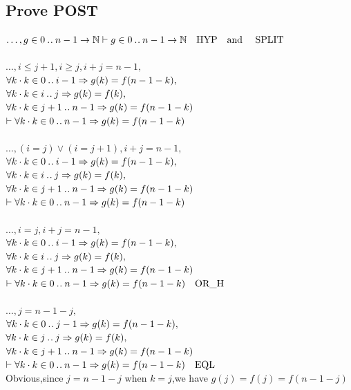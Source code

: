 \documentclass[11pt,a4paper,fleqn]{article}
\begin{document}
\subsection{ Prove POST}
\noindent
$\ldots,g\in 0\mathbin{.\mkern1mu.} n-1\rightarrow\mathbb{N}\vdash g\in 0\mathbin{.\mkern1mu.} n-1\rightarrow\mathbb{N}\quad\text{HYP\quad and \quad SPLIT}$\\
\\
$ \ldots,i\leq j+1,i\geq j,i+j=n-1,$\\
$ \forall k\cdot k\in 0\mathbin{.\mkern1mu.} i-1 \Rightarrow g(k)=f(n-1-k),$\\
$ \forall k\cdot k\in i\mathbin{.\mkern1mu.} j \Rightarrow g(k)=f(k),$\\
$ \forall k\cdot k\in j+1\mathbin{.\mkern1mu.} n-1 \Rightarrow g(k)=f(n-1-k)$\\
$\vdash \forall k\cdot k\in 0\mathbin{.\mkern1mu.} n-1 \Rightarrow g(k)=f(n-1-k)$\\
\\
$ \ldots,(i=j) \lor (i=j+1),i+j=n-1,$\\
$ \forall k\cdot k\in 0\mathbin{.\mkern1mu.} i-1 \Rightarrow g(k)=f(n-1-k),$\\
$ \forall k\cdot k\in i\mathbin{.\mkern1mu.} j \Rightarrow g(k)=f(k),$\\
$ \forall k\cdot k\in j+1\mathbin{.\mkern1mu.} n-1 \Rightarrow g(k)=f(n-1-k)$\\
$\vdash \forall k\cdot k\in 0\mathbin{.\mkern1mu.} n-1 \Rightarrow g(k)=f(n-1-k)$\\
\\
$ \ldots,i=j,i+j=n-1,$\\
$ \forall k\cdot k\in 0\mathbin{.\mkern1mu.} i-1 \Rightarrow g(k)=f(n-1-k),$\\
$ \forall k\cdot k\in i\mathbin{.\mkern1mu.} j \Rightarrow g(k)=f(k),$\\
$ \forall k\cdot k\in j+1\mathbin{.\mkern1mu.} n-1 \Rightarrow g(k)=f(n-1-k)$\\
$\vdash \forall k\cdot k\in 0\mathbin{.\mkern1mu.} n-1 \Rightarrow g(k)=f(n-1-k)\quad\text{OR\_H}$\\
\\
$ \ldots,j=n-1-j,$\\
$ \forall k\cdot k\in 0\mathbin{.\mkern1mu.} j-1 \Rightarrow g(k)=f(n-1-k),$\\
$ \forall k\cdot k\in j\mathbin{.\mkern1mu.} j \Rightarrow g(k)=f(k),$\\
$ \forall k\cdot k\in j+1\mathbin{.\mkern1mu.} n-1 \Rightarrow g(k)=f(n-1-k)$\\
$\vdash \forall k\cdot k\in 0\mathbin{.\mkern1mu.} n-1 \Rightarrow g(k)=f(n-1-k)\quad\text{EQL}$\\
Obvious,since $j=n-1-j$ when $k=j$,we have $g(j)=f(j)=f(n-1-j)$\\
\end{document}
